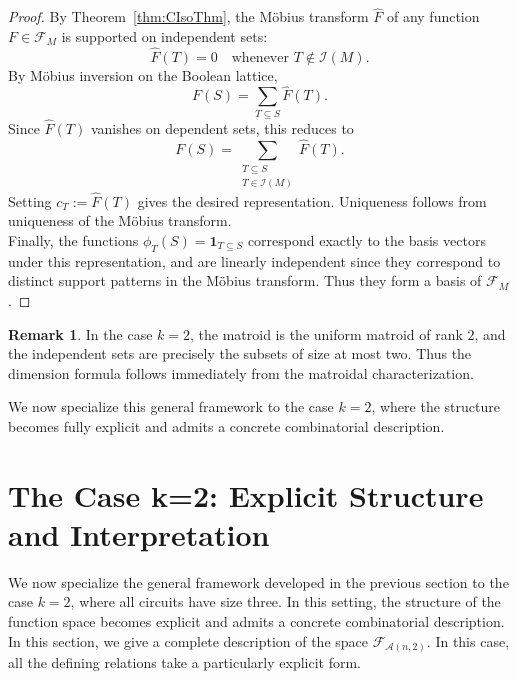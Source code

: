 \documentclass{amsart}
\theoremstyle{definition}
\newtheorem{remark}[theorem]{Remark}
\begin{document}
\begin{proof}
By Theorem~\ref{thm:CIsoThm}, the Möbius transform $\widehat{F}$ of any function $F \in \mathcal{F}_M$ is supported on independent sets:
\[
\widehat{F}(T) = 0 \quad \text{whenever } T \notin \mathcal{I}(M).
\]
\noindent
By Möbius inversion on the Boolean lattice,
\[
F(S) = \sum_{T \subseteq S} \widehat{F}(T).
\]
\noindent
Since $\widehat{F}(T)$ vanishes on dependent sets, this reduces to
\[
F(S) = \sum_{\substack{T \subseteq S \\ T \in \mathcal{I}(M)}} \widehat{F}(T).
\]
\noindent
Setting $c_T := \widehat{F}(T)$ gives the desired representation. Uniqueness follows from uniqueness of the Möbius transform.\\
\noindent
Finally, the functions $\phi_T(S) = \mathbf{1}_{T \subseteq S}$ correspond exactly to the basis vectors under this representation, and are linearly independent since they correspond to distinct support patterns in the Möbius transform. Thus they form a basis of $\mathcal{F}_M$.
\end{proof}
\begin{remark}
In the case $k=2$, the matroid is the uniform matroid of rank $2$, and the independent sets
are precisely the subsets of size at most two. Thus the dimension formula follows immediately
from the matroidal characterization.
\end{remark}
\noindent
We now specialize this general framework to the case $k=2$, where the structure becomes fully explicit and admits a concrete combinatorial description.
\section{The Case k=2: Explicit Structure and Interpretation}\label{sec:example}
We now specialize the general framework developed in the previous section to the case $k=2$, where all circuits have size three. In this setting, the structure of the function space becomes explicit and admits a concrete combinatorial description.
In this section, we give a complete description of the space $\mathcal{F}_{\mathcal{A}(n,2)}$. In this case, all the defining relations take a particularly explicit form.
\end{document}
